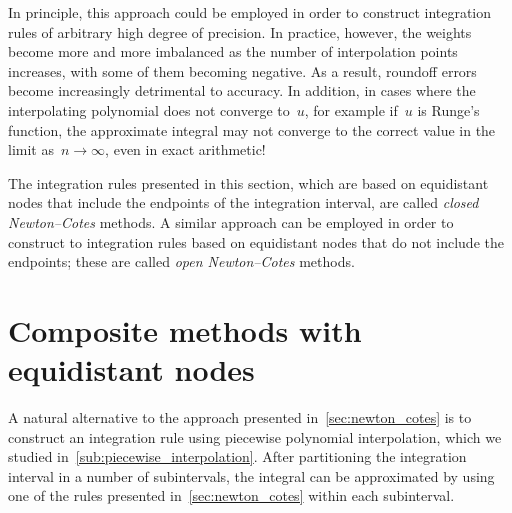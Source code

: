 In principle,
this approach could be employed in order to construct integration rules of arbitrary high degree of precision.
In practice, however, the weights become more and more imbalanced as the number of interpolation points increases,
with some of them becoming negative.
As a result, roundoff errors become increasingly detrimental to accuracy.
In addition, in cases where the interpolating polynomial does not converge to~$u$,
for example if~$u$ is Runge's function,
the approximate integral may not converge to the correct value in the limit as~$n \to \infty$,
even in exact arithmetic!

The integration rules presented in this section,
which are based on equidistant nodes that include the endpoints of the integration interval,
are called \emph{closed Newton--Cotes} methods.
A similar approach can be employed in order to construct to integration rules based on equidistant nodes that do not include the endpoints;
these are called \emph{open Newton--Cotes} methods.
\section{Composite methods with equidistant nodes}
\label{sec:composite_methods}
A natural alternative to the approach presented in~\cref{sec:newton_cotes}
is to construct an integration rule using piecewise polynomial interpolation,
which we studied in~\cref{sub:piecewise_interpolation}.
After partitioning the integration interval in a number of subintervals,
the integral can be approximated by using one of the rules presented in~\cref{sec:newton_cotes} within each subinterval.

